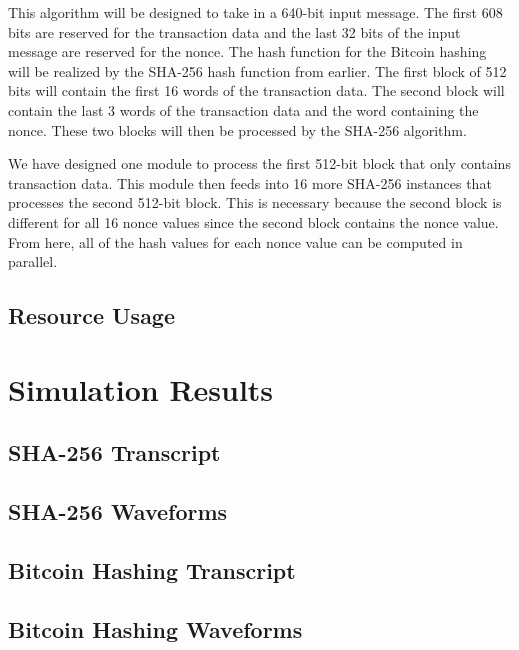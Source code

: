 \documentclass{article}
\begin{document}
This algorithm will be designed to take in a 640-bit input message. The first 608 bits are reserved for the transaction data and the last 32 bits of the input message are reserved for the nonce. The hash function for the Bitcoin hashing will be realized by the SHA-256 hash function from earlier. The first block of 512 bits will contain the first 16 words of the transaction data. The second block will contain the last 3 words of the transaction data and the word containing the nonce. These two blocks will then be processed by the SHA-256 algorithm.

We have designed one module to process the first 512-bit block that only contains transaction data. This module then feeds into 16 more SHA-256 instances that processes the second 512-bit block. This is necessary because the second block is different for all 16 nonce values since the second block contains the nonce value. From here, all of the hash values for each nonce value can be computed in parallel.


\subsection{Resource Usage}




\newpage
\section{Simulation Results}

\subsection{SHA-256 Transcript}




\subsection{SHA-256 Waveforms}

\newpage
\subsection{Bitcoin Hashing Transcript}


\subsection{Bitcoin Hashing Waveforms}

\label{LastPage}
\end{document}

